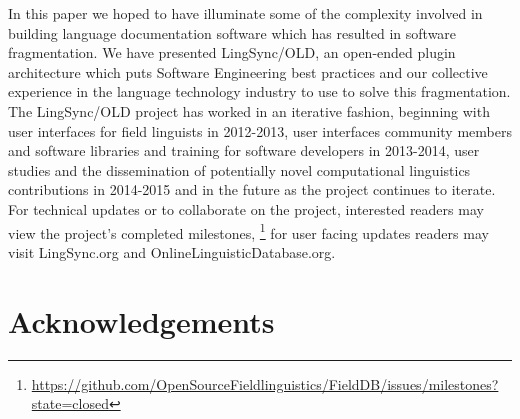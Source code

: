 \documentclass[11pt]{article}
\begin{document}
In this paper we hoped to have illuminate some of the complexity involved in
building language documentation software which has resulted in software
fragmentation. We have presented LingSync/OLD,  an open-ended plugin
architecture which puts Software Engineering best practices and our collective
experience in the language technology industry  to use to solve this
fragmentation. The LingSync/OLD project has worked in an iterative fashion,
beginning with user interfaces for field linguists in 2012-2013, user
interfaces community members and software libraries and training for software
developers in 2013-2014, user studies and the dissemination of  potentially
novel computational linguistics contributions in 2014-2015 and in the future as
the project continues to iterate.  For technical updates or to collaborate on
the project, interested readers may view the project's completed
milestones,%
\footnote{\url{https://github.com/OpenSourceFieldlinguistics/FieldDB/issues/milestones?state=closed}} %
for user facing updates readers may visit LingSync.org and
OnlineLinguisticDatabase.org.


\section*{Acknowledgements}
\end{document}
